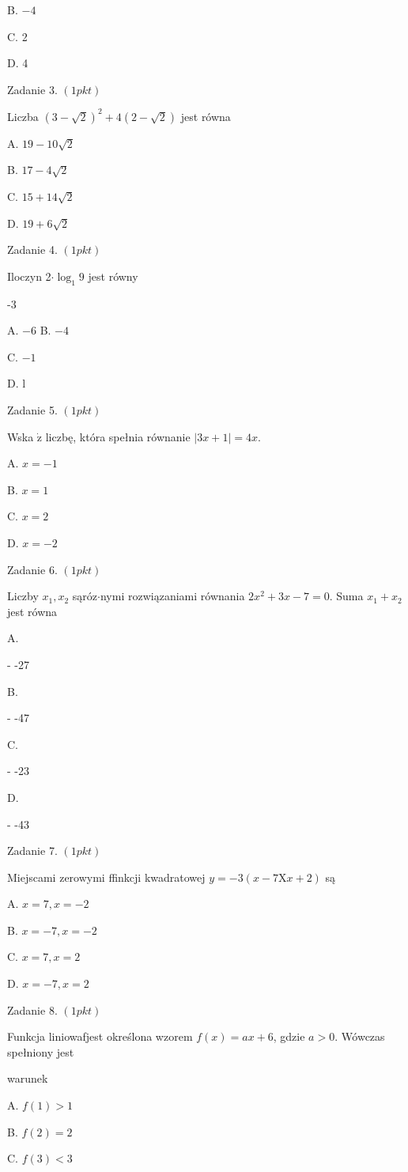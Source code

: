 \documentclass[a4paper,12pt]{article}
\begin{document}
B. $-4$

C. 2

D. 4

Zadanie 3. $(1pkt)$

Liczba $(3-\sqrt{2})^{2}+4(2-\sqrt{2})$ jest równa

A. $19-10\sqrt{2}$

B. $17-4\sqrt{2}$

C. $15+14\sqrt{2}$

D. $19+6\sqrt{2}$

Zadanie 4. $(1pkt)$

Iloczyn 2$\cdot\log_{1}9$ jest równy

-3

A. $-6$ B. $-4$

C. $-1$

D. l

Zadanie 5. $(1pkt)$

Wska $\dot{\mathrm{z}}$ liczbę, która spełnia równanie $|3x+1|=4x.$

A. $x=-1$

B. $x=1$

C. $x=2$

D. $x=-2$

Zadanie 6. $(1pkt)$

Liczby $x_{1}, x_{2}$ sąróz$\cdot$nymi rozwiązaniami równania $2x^{2}+3x-7=0$. Suma $x_{1}+x_{2}$ jest równa

A.

- -27

B.

- -47

C.

- -23

D.

- -43

Zadanie 7. $(1pkt)$

Miejscami zerowymi ffinkcji kwadratowej $y=-3(x-7\mathrm{X}x+2)$ są

A. $x=7, x=-2$

B. $x=-7, x=-2$

C. $x=7, x=2$

D. $x=-7, x=2$

Zadanie 8. $(1pkt)$

Funkcja liniowafjest określona wzorem $f(x)=ax+6$, gdzie $a>0$. Wówczas spełniony jest

warunek

A. $f(1)>1$

B. $f(2)=2$

C. $f(3)<3$
\end{document}
